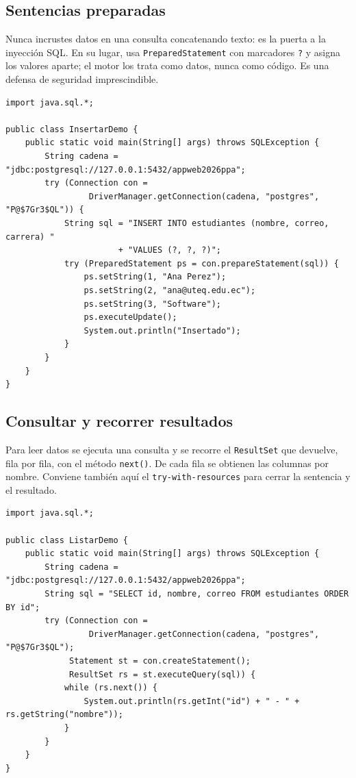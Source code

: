 \documentclass[11pt]{article}
\begin{document}
\subsection{Sentencias preparadas}
Nunca incrustes datos en una consulta concatenando texto: es la puerta a la inyección SQL. En su lugar, usa \texttt{Prepared\allowbreak{}Statement} con marcadores \texttt{?\allowbreak{}} y asigna los valores aparte; el motor los trata como datos, nunca como código. Es una defensa de seguridad imprescindible.

\begin{cajacodigo}
\begin{lstlisting}[style=java]
import java.sql.*;

public class InsertarDemo {
    public static void main(String[] args) throws SQLException {
        String cadena = "jdbc:postgresql://127.0.0.1:5432/appweb2026ppa";
        try (Connection con =
                 DriverManager.getConnection(cadena, "postgres", "P@$7Gr3$QL")) {
            String sql = "INSERT INTO estudiantes (nombre, correo, carrera) "
                       + "VALUES (?, ?, ?)";
            try (PreparedStatement ps = con.prepareStatement(sql)) {
                ps.setString(1, "Ana Perez");
                ps.setString(2, "ana@uteq.edu.ec");
                ps.setString(3, "Software");
                ps.executeUpdate();
                System.out.println("Insertado");
            }
        }
    }
}
\end{lstlisting}
\end{cajacodigo}
\vspace{2pt}
\subsection{Consultar y recorrer resultados}
Para leer datos se ejecuta una consulta y se recorre el \texttt{Result\allowbreak{}Set} que devuelve, fila por fila, con el método \texttt{next()}. De cada fila se obtienen las columnas por nombre. Conviene también aquí el \texttt{try-with-resources} para cerrar la sentencia y el resultado.

\begin{cajacodigo}
\begin{lstlisting}[style=java]
import java.sql.*;

public class ListarDemo {
    public static void main(String[] args) throws SQLException {
        String cadena = "jdbc:postgresql://127.0.0.1:5432/appweb2026ppa";
        String sql = "SELECT id, nombre, correo FROM estudiantes ORDER BY id";
        try (Connection con =
                 DriverManager.getConnection(cadena, "postgres", "P@$7Gr3$QL");
             Statement st = con.createStatement();
             ResultSet rs = st.executeQuery(sql)) {
            while (rs.next()) {
                System.out.println(rs.getInt("id") + " - " + rs.getString("nombre"));
            }
        }
    }
}
\end{lstlisting}
\end{cajacodigo}
\vspace{2pt}
\end{document}
